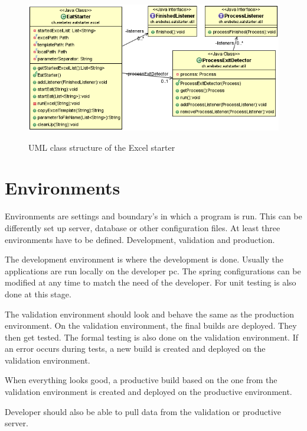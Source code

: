 \documentclass[paper=a4,twoside=false,BCOR=0mm,DIV=calc,fontsize=12pt]{scrartcl}
\begin{document}
\begin{figure}
    \begin{center}
      \includegraphics[width=1\textwidth]{./img/uml_eatstatreter_model.png}\\
    \end{center}
  \caption{UML class structure of the Excel starter}
  \label{eatstarterclassuml}
\end{figure} 





\section{Environments}
Environments are settings and boundary's in which a program is run. This can be differently set up server, database or other configuration files.
At least three environments have to be defined. Development, validation and production. 

The development environment is where the development is done. Usually the applications are run locally on the developer pc. The spring configurations can be modified at any time to match the need of the developer.
For unit testing is also done at this stage.

The validation environment should look and behave the same as the production environment. On the validation environment, the final builds are deployed. They then get tested. The formal testing is also done on the validation environment. If an error occurs during tests, a new build is created and deployed on the validation environment.

When everything looks good, a productive build based on the one from the validation environment is created and deployed on the productive environment.

Developer should also be able to pull data from the validation or productive server.
\end{document}
